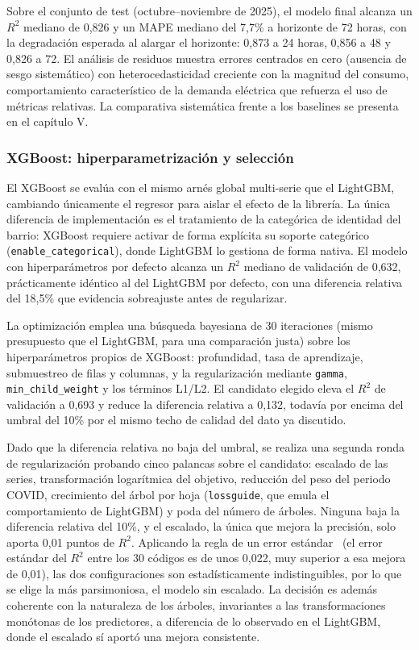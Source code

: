 \documentclass[12pt, a4paper]{article}
\begin{document}
Sobre el conjunto de test (octubre--noviembre de 2025), el modelo final alcanza un $R^2$ mediano de 0,826 y un MAPE mediano del 7,7\% a horizonte de 72 horas, con la degradación esperada al alargar el horizonte: 0,873 a 24 horas, 0,856 a 48 y 0,826 a 72. El análisis de residuos muestra errores centrados en cero (ausencia de sesgo sistemático) con heterocedasticidad creciente con la magnitud del consumo, comportamiento característico de la demanda eléctrica que refuerza el uso de métricas relativas. La comparativa sistemática frente a los baselines se presenta en el capítulo V.

\subsubsection{XGBoost: hiperparametrización y selección}


El XGBoost se evalúa con el mismo arnés global multi-serie que el LightGBM, cambiando únicamente el regresor para aislar el efecto de la librería. La única diferencia de implementación es el tratamiento de la categórica de identidad del barrio: XGBoost requiere activar de forma explícita su soporte categórico (\texttt{enable\_categorical}), donde LightGBM lo gestiona de forma nativa. El modelo con hiperparámetros por defecto alcanza un $R^2$ mediano de validación de 0,632, prácticamente idéntico al del LightGBM por defecto, con una diferencia relativa del 18,5\% que evidencia sobreajuste antes de regularizar.

La optimización emplea una búsqueda bayesiana de 30 iteraciones (mismo presupuesto que el LightGBM, para una comparación justa) sobre los hiperparámetros propios de XGBoost: profundidad, tasa de aprendizaje, submuestreo de filas y columnas, y la regularización mediante \texttt{gamma}, \texttt{min\_child\_weight} y los términos L1/L2. El candidato elegido eleva el $R^2$ de validación a 0,693 y reduce la diferencia relativa a 0,132, todavía por encima del umbral del 10\% por el mismo techo de calidad del dato ya discutido.

Dado que la diferencia relativa no baja del umbral, se realiza una segunda ronda de regularización probando cinco palancas sobre el candidato: escalado de las series, transformación logarítmica del objetivo, reducción del peso del periodo COVID, crecimiento del árbol por hoja (\texttt{lossguide}, que emula el comportamiento de LightGBM) y poda del número de árboles. Ninguna baja la diferencia relativa del 10\%, y el escalado, la única que mejora la precisión, solo aporta 0,01 puntos de $R^2$. Aplicando la regla de un error estándar~\cite{hastie2009} (el error estándar del $R^2$ entre los 30 códigos es de unos 0,022, muy superior a esa mejora de 0,01), las dos configuraciones son estadísticamente indistinguibles, por lo que se elige la más parsimoniosa, el modelo sin escalado. La decisión es además coherente con la naturaleza de los árboles, invariantes a las transformaciones monótonas de los predictores, a diferencia de lo observado en el LightGBM, donde el escalado sí aportó una mejora consistente.
\end{document}
